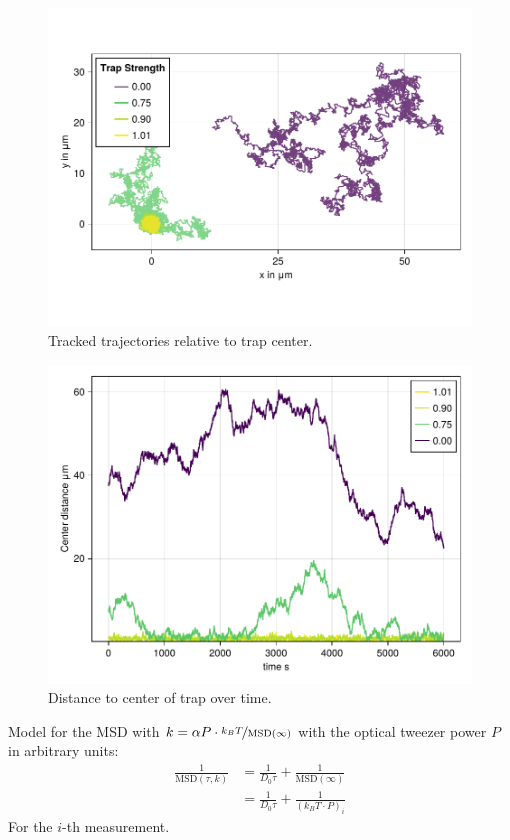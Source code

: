 \documentclass[
    parskip=half, 
    twoside=false,
    twocolumn=true,
    fontsize=11pt,
]{scrarticle}
\begin{document}
\begin{figure}[h]
    \centering
    \includegraphics{figures/01_02_1_trajectories.pdf}
    \caption{Tracked trajectories relative to trap center.}
\end{figure}
\begin{figure}[h]
    \centering
    \includegraphics{figures/01_02_2_center_distances.pdf}
    \caption{Distance to center of trap over time.}
\end{figure}

Model for the MSD with $k=\alpha P \cdot\nicefrac{k_B T}{\text{MSD}(\infty)}$ with the optical tweezer power $P$ in arbitrary units:
\begin{align}
    \frac{1}{\text{MSD}(\tau, k)}
    &= \frac{1}{D_0 \tau} + \frac{1}{\text{MSD}(\infty)}\\
    &= \frac{1}{D_0 \tau} + \frac{1}{(k_B T \cdot P)_i}
    \label{eq:01_mdl_msd} 
\end{align}
For the $i$-th measurement.
\end{document}
